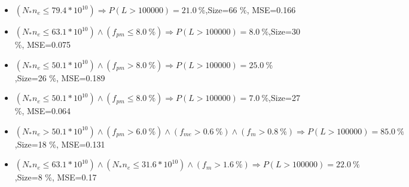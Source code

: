 \documentclass[numbered]{CSL}
\begin{document}
\begin{itemize}
\item $(N_* n_e \leq 79.4 * 10^{10}) \Rightarrow P(L > 100 000) = 21.0~\%$,\hfill Size=66 \%, MSE=0.166
\item $(N_* n_e \leq 63.1 * 10^{10}) \land (f_{pm} \leq 8.0~\%) \Rightarrow P(L > 100 000) = 8.0~\%$,\hfill Size=30 \%, MSE=0.075
\item $(N_* n_e \leq 50.1 * 10^{10}) \land (f_{pm} > 8.0~\%) \Rightarrow P(L > 100 000) = 25.0~\%$,\hfill Size=26 \%, MSE=0.189
\item $(N_* n_e \leq 50.1 * 10^{10}) \land (f_{pm} \leq 8.0~\%) \Rightarrow P(L > 100 000) = 7.0~\%$,\hfill Size=27 \%, MSE=0.064
\item $(N_* n_e > 50.1 * 10^{10}) \land (f_{pm} > 6.0~\%) \land (f_{me} > 0.6~\%) \land (f_m > 0.8~\%) \Rightarrow P(L > 100 000) = 85.0~\%$,\hfill Size=18 \%, MSE=0.131
\item $(N_* n_e \leq 63.1 * 10^{10}) \land (N_* n_e \leq 31.6 * 10^{10}) \land (f_m > 1.6~\%) \Rightarrow P(L > 100 000) = 22.0~\%$,\hfill Size=8 \%, MSE=0.17
\end{itemize}
\end{document}
